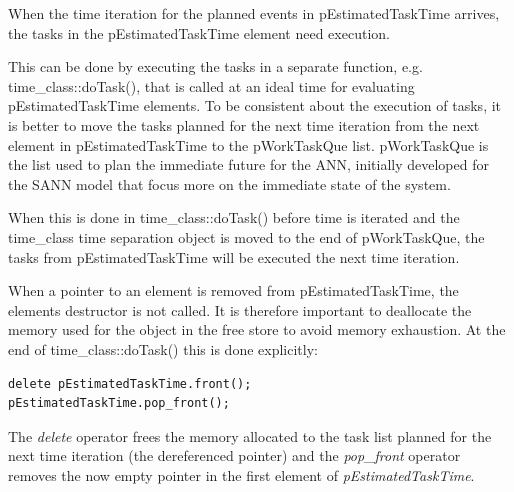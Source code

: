 	When the time iteration for the planned events in pEstimatedTaskTime arrives, the tasks in the pEstimatedTaskTime element need execution.

	This can be done by executing the tasks in a separate function, e.g. time\_class::doTask(), that is called at an ideal time for evaluating pEstimatedTaskTime elements.
	To be consistent about the execution of tasks, it is better to move the tasks planned for the next time iteration from the next element in pEstimatedTaskTime to the pWorkTaskQue list.
	pWorkTaskQue is the list used to plan the immediate future for the ANN, initially developed for the SANN model that focus more on the immediate state of the system.

	When this is done in time\_class::doTask() before time is iterated and the time\_class time separation object is moved to the end of pWorkTaskQue, the tasks from pEstimatedTaskTime will be executed the next time iteration.

	When a pointer to an element is removed from pEstimatedTaskTime, the elements destructor is not called. 
	It is therefore important to deallocate the memory used for the object in the free store to avoid memory exhaustion.
	At the end of time\_class::doTask() this is done explicitly:
\begin{lstlisting}
delete pEstimatedTaskTime.front();
pEstimatedTaskTime.pop_front();
\end{lstlisting}
	The \emph{delete} operator frees the memory allocated to the task list planned for the next time iteration (the dereferenced pointer)
	and the \emph{pop\_front{}} operator removes the now empty pointer in the first element of \emph{pEstimatedTaskTime}.


	

